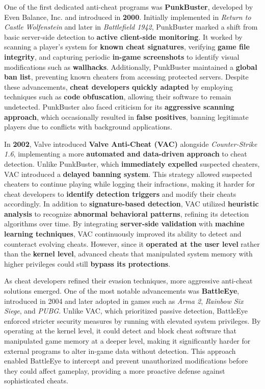 One of the first dedicated anti-cheat programs was \textbf{PunkBuster}, developed by Even Balance, Inc. and introduced in \textbf{2000}. Initially implemented in \textit{Return to Castle Wolfenstein} and later in \textit{Battlefield 1942}, PunkBuster marked a shift from basic server-side detection to \textbf{active client-side monitoring}. It worked by scanning a player’s system for \textbf{known cheat signatures}, verifying \textbf{game file integrity}, and capturing periodic \textbf{in-game screenshots} to identify visual modifications such as \textbf{wallhacks}. Additionally, PunkBuster maintained a \textbf{global ban list}, preventing known cheaters from accessing protected servers. Despite these advancements, \textbf{cheat developers quickly adapted} by employing techniques such as \textbf{code obfuscation}, allowing their software to remain undetected. PunkBuster also faced criticism for its \textbf{aggressive scanning approach}, which occasionally resulted in \textbf{false positives}, banning legitimate players due to conflicts with background applications.

In \textbf{2002}, Valve introduced \textbf{Valve Anti-Cheat (VAC)} alongside \textit{Counter-Strike 1.6}, implementing a more \textbf{automated and data-driven approach} to cheat detection. Unlike PunkBuster, which \textbf{immediately expelled} suspected cheaters, VAC introduced a \textbf{delayed banning system}. This strategy allowed suspected cheaters to continue playing while logging their infractions, making it harder for cheat developers to \textbf{identify detection triggers} and modify their cheats accordingly. In addition to \textbf{signature-based detection}, VAC utilized \textbf{heuristic analysis} to recognize \textbf{abnormal behavioral patterns}, refining its detection algorithms over time. By integrating \textbf{server-side validation} with \textbf{machine learning techniques}, VAC continuously improved its ability to detect and counteract evolving cheats. However, since it \textbf{operated at the user level} rather than the \textbf{kernel level}, advanced cheats that manipulated system memory with higher privileges could still \textbf{bypass its protections}.

As cheat developers refined their evasion techniques, more aggressive anti-cheat solutions emerged. One of the most notable advancements was \textbf{BattleEye}, introduced in 2004 and later adopted in games such as \textit{Arma 2}, \textit{Rainbow Six Siege}, and \textit{PUBG}. Unlike VAC, which prioritized passive detection, BattleEye enforced stricter security measures by running with elevated system privileges. By operating at the kernel level, it could detect and block cheat software that manipulated game memory at a deeper level, making it significantly harder for external programs to alter in-game data without detection. This approach enabled BattleEye to intercept and prevent unauthorized modifications before they could affect gameplay, providing a more proactive defense against sophisticated cheats.

